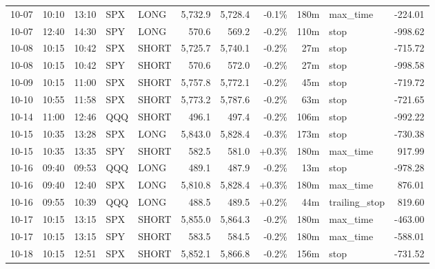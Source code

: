 \documentclass[11pt,a4paper,twoside]{article}
\begin{document}
\begin{center}
\begin{longtable}{>{\color{txtmain}}l l l l l r r r r >{\color{txtmain}}l r}
10-07 & 10:10 & 13:10 & SPX & LONG & 5,732.9 & 5,728.4 & \textcolor{lossred}{-0.1\%} & 180m & max\_time & \textcolor{lossred}{-224.01} \\
10-07 & 12:40 & 14:30 & SPY & LONG & 570.6 & 569.2 & \textcolor{lossred}{-0.2\%} & 110m & stop & \textcolor{lossred}{-998.62} \\
10-08 & 10:15 & 10:42 & SPX & SHORT & 5,725.7 & 5,740.1 & \textcolor{lossred}{-0.2\%} & 27m & stop & \textcolor{lossred}{-715.72} \\
10-08 & 10:15 & 10:42 & SPY & SHORT & 570.6 & 572.0 & \textcolor{lossred}{-0.2\%} & 27m & stop & \textcolor{lossred}{-998.58} \\
10-09 & 10:15 & 11:00 & SPX & SHORT & 5,757.8 & 5,772.1 & \textcolor{lossred}{-0.2\%} & 45m & stop & \textcolor{lossred}{-719.72} \\
10-10 & 10:55 & 11:58 & SPX & SHORT & 5,773.2 & 5,787.6 & \textcolor{lossred}{-0.2\%} & 63m & stop & \textcolor{lossred}{-721.65} \\
10-14 & 11:00 & 12:46 & QQQ & SHORT & 496.1 & 497.4 & \textcolor{lossred}{-0.2\%} & 106m & stop & \textcolor{lossred}{-992.22} \\
10-15 & 10:35 & 13:28 & SPX & LONG & 5,843.0 & 5,828.4 & \textcolor{lossred}{-0.3\%} & 173m & stop & \textcolor{lossred}{-730.38} \\
10-15 & 10:35 & 13:35 & SPY & SHORT & 582.5 & 581.0 & \textcolor{wingreen}{+0.3\%} & 180m & max\_time & \textcolor{wingreen}{917.99} \\
10-16 & 09:40 & 09:53 & QQQ & LONG & 489.1 & 487.9 & \textcolor{lossred}{-0.2\%} & 13m & stop & \textcolor{lossred}{-978.28} \\
10-16 & 09:40 & 12:40 & SPX & LONG & 5,810.8 & 5,828.4 & \textcolor{wingreen}{+0.3\%} & 180m & max\_time & \textcolor{wingreen}{876.01} \\
10-16 & 09:55 & 10:39 & QQQ & LONG & 488.5 & 489.5 & \textcolor{wingreen}{+0.2\%} & 44m & trailing\_stop & \textcolor{wingreen}{819.60} \\
10-17 & 10:15 & 13:15 & SPX & SHORT & 5,855.0 & 5,864.3 & \textcolor{lossred}{-0.2\%} & 180m & max\_time & \textcolor{lossred}{-463.00} \\
10-17 & 10:15 & 13:15 & SPY & SHORT & 583.5 & 584.5 & \textcolor{lossred}{-0.2\%} & 180m & max\_time & \textcolor{lossred}{-588.01} \\
10-18 & 10:15 & 12:51 & SPX & SHORT & 5,852.1 & 5,866.8 & \textcolor{lossred}{-0.2\%} & 156m & stop & \textcolor{lossred}{-731.52} \\

\end{longtable}
\end{center}
\end{document}
